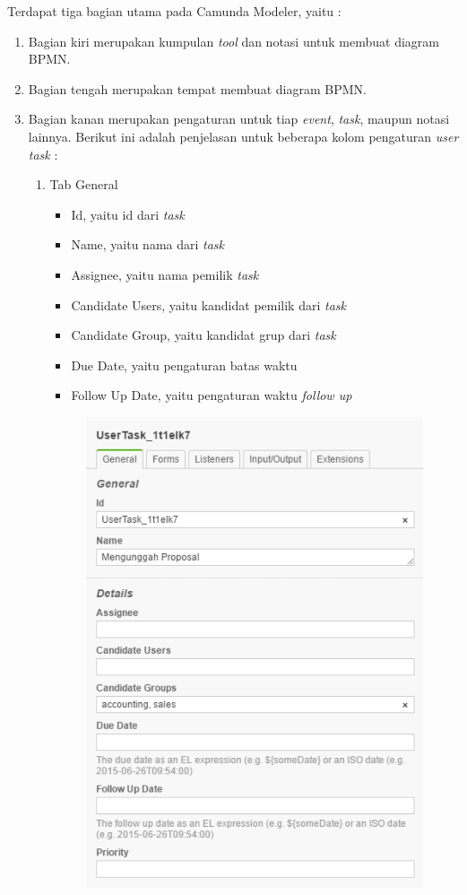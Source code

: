 \begin{itemize}
		Terdapat tiga bagian utama pada Camunda Modeler, yaitu :
\begin{enumerate}
	\item Bagian kiri merupakan kumpulan \textit{tool} dan notasi untuk membuat diagram BPMN.
	\item Bagian tengah merupakan tempat membuat diagram BPMN.
	\item Bagian kanan merupakan pengaturan untuk tiap \textit{event}, \textit{task}, maupun notasi lainnya. Berikut ini adalah penjelasan untuk beberapa kolom pengaturan \textit{user task} :
	\begin{enumerate}
		\item Tab General
			\begin{itemize}
				\item Id, yaitu id dari \textit{task}
				\item Name, yaitu nama dari \textit{task}
				\item Assignee, yaitu nama pemilik \textit{task}
				\item Candidate Users, yaitu kandidat pemilik dari \textit{task}
				\item Candidate Group, yaitu kandidat grup dari \textit{task}
				\item Due Date, yaitu pengaturan batas waktu
				\item Follow Up Date, yaitu pengaturan waktu \textit{follow up}
			\end{itemize}
			\begin{figure}[H]
				\centering
				\includegraphics[scale=0.5]{Gambar/Bab-3/Modeler/3Properties}

\end{figure}
\end{enumerate}
\end{enumerate}
\end{itemize}
